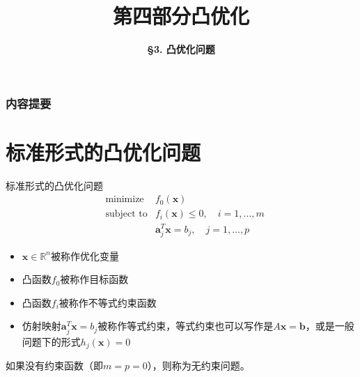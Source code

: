 \documentclass[10pt]{beamer}
\title[Convex Optimization]{\LARGE \bfseries 第四部分\quad 凸优化} %
\author[Convex Optimization Problems] %
{\Large \bfseries \S 3. 凸优化问题}
\date{}
\begin{document}

\begin{frame}

\titlepage %

\end{frame}


\begin{frame}
\frametitle{内容提要} %
\tableofcontents %
\end{frame}


\section{标准形式的凸优化问题}


\begin{frame}

\begin{block}{标准形式的{\color{cyan}凸}优化问题}
\begin{eqnarray*}
& \text{minimize} & f_0(\mathbf{x}) \\
& \text{subject to} & f_i(\mathbf{x}) \le 0, \quad i = 1,\ldots,m \\
& & \mathbf{a}_j^T\mathbf{x} = b_j, \quad j = 1,\ldots,p
\end{eqnarray*}
\begin{itemize}
\item $\mathbf{x} \in \mathbb{R}^n$被称作优化变量
\item {\color{cyan}凸函数}$f_0$被称作目标函数
\item {\color{cyan}凸函数}$f_i$被称作不等式约束函数
\item {\color{cyan}仿射映射}$\mathbf{a}_j^T\mathbf{x} = b_j$被称作等式约束，等式约束也可以写作是$A\mathbf{x} = \mathbf{b}$，或是一般问题下的形式$h_j(\mathbf{x}) = 0$
\end{itemize}

\vspace{1em}

如果没有约束函数（即$m=p=0$），则称为无约束问题。
\end{block}

\end{frame}
\end{document}
